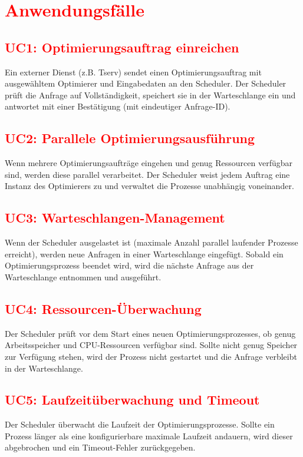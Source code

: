 \section{\textcolor{red}{Anwendungsfälle}}

\subsection{\textcolor{red}{UC1: Optimierungsauftrag einreichen}}
Ein externer Dienst (z.B. Tserv) sendet einen Optimierungsauftrag mit ausgewähltem Optimierer und Eingabedaten an den Scheduler. Der Scheduler prüft die Anfrage auf Vollständigkeit, speichert sie in der Warteschlange ein und antwortet mit einer Bestätigung (mit eindeutiger Anfrage-ID).

\subsection{\textcolor{red}{UC2: Parallele Optimierungsausführung}}
Wenn mehrere Optimierungsaufträge eingehen und genug Ressourcen verfügbar sind, werden diese parallel verarbeitet. Der Scheduler weist jedem Auftrag eine Instanz des Optimierers zu und verwaltet die Prozesse unabhängig voneinander.

\subsection{\textcolor{red}{UC3: Warteschlangen-Management}}
Wenn der Scheduler ausgelastet ist (maximale Anzahl parallel laufender Prozesse erreicht), werden neue Anfragen in einer Warteschlange eingefügt. Sobald ein Optimierungsprozess beendet wird, wird die nächste Anfrage aus der Warteschlange entnommen und ausgeführt.

\subsection{\textcolor{red}{UC4: Ressourcen-Überwachung}}
Der Scheduler prüft vor dem Start eines neuen Optimierungsprozesses, ob genug Arbeitsspeicher und CPU-Ressourcen verfügbar sind. Sollte nicht genug Speicher zur Verfügung stehen, wird der Prozess nicht gestartet und die Anfrage verbleibt in der Warteschlange.

\subsection{\textcolor{red}{UC5: Laufzeitüberwachung und Timeout}}
Der Scheduler überwacht die Laufzeit der Optimierungsprozesse. Sollte ein Prozess länger als eine konfigurierbare maximale Laufzeit andauern, wird dieser abgebrochen und ein Timeout-Fehler zurückgegeben.

